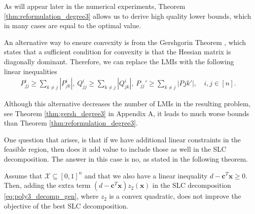\documentclass[opre,nonblindrev]{informs3} %
\begin{document}
As will appear later in the numerical experiments, Theorem \eqref{thm:reformulation_degree3} allows us to derive high quality lower bounds, which in many cases are equal to the optimal value.

An alternative way to ensure convexity is from the Gershgorin Theorem \cite{gershgorin1931uber}, which states that a sufficient condition for convexity is that the Hessian matrix is diagonally dominant. Therefore, we can replace the LMIs with the following linear inequalities
\begin{align*}
    P^i_{jj} \ge \sum_{k \neq j} \left \lvert P^i_{jk} \right \rvert, \ Q^i_{jj} \ge \sum_{k \neq j} \left \lvert Q^i_{jk} \right \rvert, \ P_{jj}' \ge \sum_{k \neq j} \left \lvert P{jk}' \right \rvert, \quad i,j \in [n].
\end{align*} 

{\color{black} Although this alternative decreases the number of LMIs in the resulting problem, see Theorem \ref{thm:gersh_degree3} in Appendix A, it leads to much worse bounds than Theorem \ref{thm:reformulation_degree3}.}

One question that arises, is that if we have additional linear constraints in the feasible region, then does it add value to include those as well in the SLC decomposition. The answer in this case is no, as stated in the following theorem.

\begin{theorem}
    Assume that $\mathcal{X} \subseteq [0,1]^n$ and that we also have a linear inequality $d - \boldsymbol{c}^T \boldsymbol{x} \ge 0$. Then, {\color{black} adding the extra term $(d-\boldsymbol{c}^T\boldsymbol{x})z_2(\boldsymbol{x})$ in the SLC decomposition \eqref{eq:poly3_decomp_gen}}, where $z_2$ is a convex quadratic, does not improve the objective of the best SLC decomposition. 
\end{theorem} 
\end{document}
